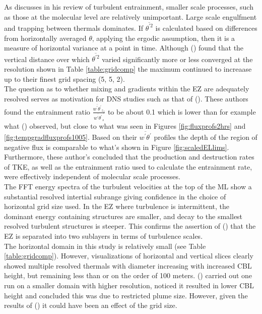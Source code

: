 As \citeauthor{Turner86} discusses in his \citeyear{Turner86} review of turbulent entrainment, smaller scale processes, such as those at the molecular level are relatively unimportant.  Large scale engulfment and trapping between thermals dominates.  If $\overline{\theta^{'2}}$ is calculated based on differences from horizontally averaged $\theta$, applying the ergodic assumption, then it is a measure of horizontal variance at a point in time. Although \citeauthor{SullPat} (\citeyear{SullPat}) found that the vertical distance over which $\overline{\theta^{'2}}$ varied significantly more or less converged at the resolution shown in Table \ref{table:gridcomp} the maximum continued to increaase up to their finest grid spacing (5, 5, 2).\\

The question as to whether mixing and gradients within the \acs{EZ} are adequately resolved serves as motivation for \acs{DNS}  studies such as that of \citeauthor{GarciaMellado} (\citeyear{GarciaMellado}). These authors found the entrainment ratio $\frac{\overline{w^{'}\theta^{'}}_{z_{f}}}{\overline{w^{'}\theta^{'}}_{s}}$ to be about 0.1 which is lower than for example what \citeauthor{FedConzMir04} (\citeyear{FedConzMir04}) observed, but close to what was seen in Figures \ref{fig:fluxprofs2hrs} and \ref{fig:tempgradfluxprofs1005}.  Based on their $\overline{w^{'}\theta^{'}}$ profiles the depth of the region of negative flux is comparable to what's shown in Figure \ref{fig:scaledELlims}.  Furthermore, these author's concluded that the production and destruction rates of \acs{TKE}, as well as the entrainment ratio used to calculate the entrainment rate, were effectively independent of molecular scale processes.\\  
  
The \acs{FFT} energy spectra of the turbulent velocities at the top of the \acs{ML} show a substantial resolved intertial subrange giving confidence in the choice of horizontal grid size used. In the \acs{EZ} where turbulence is intermittent, the dominant energy containing structures are smaller, and decay to the smallest resolved turbulent structures is steeper. This confirms the assertion of \citeauthor{GarciaMellado} (\citeyear{GarciaMellado}) that the \acs{EZ} is separated into two sublayers in terms of turbulence scales.\\


The horizontal domain in this study is relatively small (see Table \ref{table:gridcomp}). However, visualizations of horizontal and vertical slices clearly showed multiple resolved thermals with diameter increasing with increased \acs{CBL} height, but remaining less than or on the order of 100 meters.  \citeauthor{SullMoengStev} (\citeyear{SullMoengStev}) carried out one run on a smaller domain with higher resolution, noticed it resulted in lower \acs{CBL} height and concluded this was due to restricted plume size. However, given the results of \citeauthor{SullPat} (\citeyear{SullPat}) it could have been an effect of the grid size.\\   

